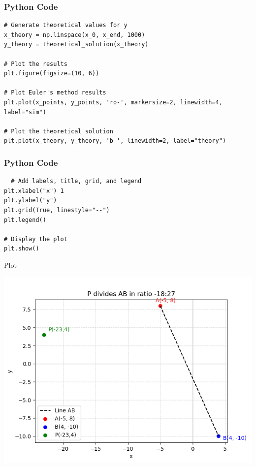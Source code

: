\documentclass{beamer}
\begin{document}
\begin{frame}[fragile]
    \frametitle{Python Code}

    \begin{lstlisting}
# Generate theoretical values for y
x_theory = np.linspace(x_0, x_end, 1000)
y_theory = theoretical_solution(x_theory)

# Plot the results
plt.figure(figsize=(10, 6))

# Plot Euler's method results
plt.plot(x_points, y_points, 'ro-', markersize=2, linewidth=4, label="sim")

# Plot the theoretical solution
plt.plot(x_theory, y_theory, 'b-', linewidth=2, label="theory")

    \end{lstlisting}
\end{frame}

\begin{frame}[fragile]
    \frametitle{Python Code}

    \begin{lstlisting}
  # Add labels, title, grid, and legend
plt.xlabel("x") 1
plt.ylabel("y")
plt.grid(True, linestyle="--")
plt.legend()

# Display the plot
plt.show()
    \end{lstlisting}
\end{frame}

\begin{frame}{Plot}
    \begin{center}
        \includegraphics[width=0.6\columnwidth]{figs/Figure_1.png}
    \end{center}
\end{frame}
\end{document}
